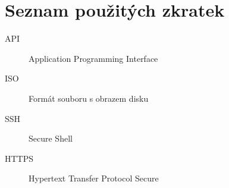 \chapter{Seznam použitých zkratek}

\begin{description}
	\item[API] Application Programming Interface
	\item[ISO] Formát souboru s obrazem disku
	\item[SSH] Secure Shell
	\item[HTTPS] Hypertext Transfer Protocol Secure
\end{description}
